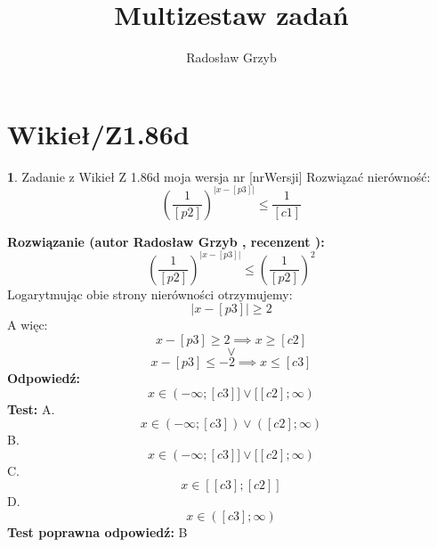 \documentclass[12pt, a4paper]{article}
\title{Multizestaw zadań}
\author{Radosław Grzyb}
\date{}
\theoremstyle{definition} %
\newtheorem{zad}{}
\newcommand{\kategoria}[1]{\section{#1}} %
\newcommand{\zadStart}[1]{\begin{zad}#1\newline} %
\newcommand{\zadStop}{\end{zad}}   %
\newcommand{\rozwStart}[2]{\noindent \textbf{Rozwiązanie (autor #1 , recenzent #2): }\newline} %
\newcommand{\rozwStop}{\newline}                                            %
\newcommand{\odpStart}{\noindent \textbf{Odpowiedź:}\newline}    %
\newcommand{\odpStop}{\newline}                                             %
\newcommand{\testStart}{\noindent \textbf{Test:}\newline} %
\newcommand{\testStop}{\newline} %
\newcommand{\kluczStart}{\noindent \textbf{Test poprawna odpowiedź:}\newline} %
\newcommand{\kluczStop}{\newline} %
\begin{document}
\maketitle
\kategoria{Wikieł/Z1.86d}
\zadStart{Zadanie z Wikieł Z 1.86d moja wersja nr [nrWersji]}
Rozwiązać nierówność:
$$\left(\frac{1}{[p2]}\right)^{|x-[p3]|}\leq\frac{1}{[c1]}$$
\zadStop
\rozwStart{Radosław Grzyb}{}
$$\left(\frac{1}{[p2]}\right)^{|x-[p3]|}\leq\left(\frac{1}{[p2]}\right)^{2}$$
Logarytmując obie strony nierówności otrzymujemy:
$$|x-[p3]|\geq2$$
A więc:
$$x-[p3]\geq2\implies x\geq[c2]$$ $$\vee$$ $$x-[p3]\leq-2\implies x\leq[c3]$$
\rozwStop
\odpStart
$$x \in (-\infty;[c3]] \vee [[c2];\infty)$$
\odpStop
\testStart
A.$$x \in (-\infty;[c3]) \vee ([c2];\infty)$$
B.$$x \in (-\infty;[c3]] \vee [[c2];\infty)$$
C.$$x \in [[c3];[c2]]$$
D.$$x \in ([c3];\infty)$$
\testStop
\kluczStart
B
\kluczStop
\end{document}
